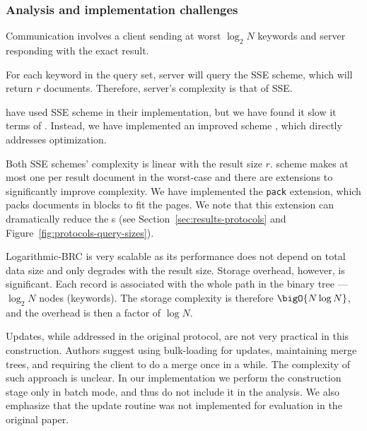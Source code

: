 	\subsubsection{Analysis and implementation challenges}

		Communication involves a client sending at worst $\log_2 N$ keywords and server responding with the exact result.

		For each keyword in the query set, server will query the SSE scheme, which will return $r$ documents.
		Therefore, server's {\IO} complexity is that of SSE\@.

		\textcite{practical-range-search} have used \cite{cjjkrs-13} SSE scheme in their implementation, but we have found it slow it terms of {\IO}.
		Instead, we have implemented an improved scheme \cite{cjjjkrs-14}, which directly addresses {\IO} optimization.

		Both SSE schemes' {\IO} complexity is linear with the result size $r$.
		\cite{cjjjkrs-14} scheme makes at most one {\IO} per result document in the worst-case and there are extensions to significantly improve {\IO} complexity. %
		We have implemented the \texttt{pack} extension, which packs documents in blocks to fit the {\IO} pages.
		We note that this extension can dramatically reduce the {\IO}s (see Section~\ref{sec:results-protocols} and Figure~\ref{fig:protocols-query-sizes}).

		Logarithmic\hyp{}BRC is very scalable as its performance does not depend on total data size and only degrades with the result size.
		Storage overhead, however, is significant.
		Each record is associated with the whole path in the binary tree --- $\log_2 N$ nodes (keywords).
		The storage complexity is therefore $\bigO{N \log N}$, and the overhead is then a factor of $\log N$.

		Updates, while addressed in the original protocol, are not very practical in this construction.
		Authors suggest using bulk-loading for updates, maintaining merge trees, and requiring the client to do a merge once in a while.
		The {\IO} complexity of such approach is unclear.
		In our implementation we perform the construction stage only in batch mode, and thus do not include it in the analysis.
		We also emphasize that the update routine was not implemented for evaluation in the original paper.
